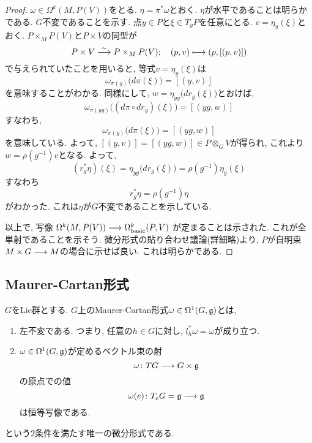 \begin{proof}
$\omega \in \Omega^k(M, P(V))$をとる.
$\eta = \pi^* \omega$とおく.
$\eta$が水平であることは明らかである.
$G$不変であることを示す.
点$y \in P$と$\xi \in T_yP$を任意にとる.
$v = \eta_y(\xi)$とおく.
$P \times_M P(V)$と$P \times V$の同型が
\begin{equation}
  P \times V \stackrel{\sim}{\longrightarrow} P \times_M P(V); \quad (p, v) \longmapsto (p, [(p, v)])
\end{equation}
で与えられていたことを用いると, 等式$v = \eta_y(\xi)$は
\begin{equation}
\omega_{\pi(y)}\bigl(d\pi(\xi)\bigr) = [(y, v)]
\end{equation}
を意味することがわかる.
同様にして, $w = \eta_{yg}\bigl(dr_g(\xi)\bigr)$とおけば,
\begin{equation}
\omega_{\pi(yg)}\bigl((d\pi\circ dr_g)(\xi)\bigr) = [(yg, w)]
\end{equation}
すなわち,
\begin{equation}
\omega_{\pi(y)}\bigl(d\pi(\xi)\bigr) = [(yg, w)]
\end{equation}
を意味している.
よって, $[(y, v)] = [(yg, w)] \in P \otimes_G V$が得られ,
これより$w = \rho(g^{-1})v$となる.
よって,
\begin{equation}
  (r_g^*\eta)(\xi) = \eta_{yg}\bigl(dr_g(\xi)\bigr) = \rho(g^{-1}) \eta_y(\xi)
\end{equation}
すなわち
\begin{equation}
r_g^* \eta = \rho(g^{-1})\eta
\end{equation}
がわかった.
これは$\eta$が$G$不変であることを示している.

以上で, 写像
$\Omega^k(M, P(V)) \longrightarrow \Omega^k_{\mathrm{basic}}(P, V)$
が定まることは示された.
これが全単射であることを示そう.
微分形式の貼り合わせ議論(詳細略)より, $P$が自明束$M \times G \longrightarrow M$の場合に示せば良い.
これは明らかである.
\end{proof}

\subsection{Maurer-Cartan形式}
\begin{dfn}
$G$をLie群とする.
$G$上のMaurer-Cartan形式$\omega \in \Omega^1(G, \mathfrak{g})$とは,
\begin{enumerate}
\item
左不変である.
つまり, 任意の$h \in G$に対し, $l_h^* \omega = \omega$が成り立つ.
\item
$\omega \in \Omega^1(G, \mathfrak{g})$が定めるベクトル束の射
\begin{equation}
\omega \colon TG \longrightarrow G \times \mathfrak{g}
\end{equation}
の原点での値
\begin{equation}
\omega(e) \colon T_eG = \mathfrak{g} \longrightarrow \mathfrak{g}
\end{equation}
は恒等写像である.
\end{enumerate}
という2条件を満たす唯一の微分形式である.
\end{dfn}

